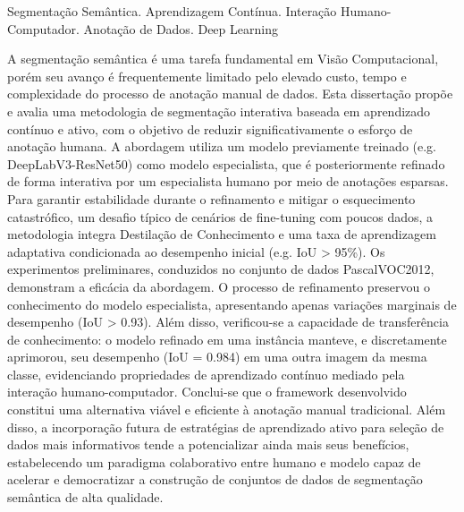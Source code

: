 \documentclass[dissertmst]{ufscar}
\begin{document}
\begin{resumo}{Segmentação Semântica. Aprendizagem Contínua. Interação Humano-Computador. Anotação de Dados. Deep Learning}

A segmentação semântica é uma tarefa fundamental em Visão Computacional, porém seu avanço é frequentemente limitado pelo elevado custo, tempo e complexidade do processo de anotação manual de dados. Esta dissertação propõe e avalia 
uma metodologia de segmentação interativa baseada em aprendizado contínuo e ativo, com o objetivo de reduzir significativamente o esforço de anotação humana. A abordagem utiliza um modelo previamente treinado (e.g. DeepLabV3-ResNet50) como modelo especialista, que é posteriormente refinado de forma interativa por um especialista humano por meio de anotações esparsas. Para garantir estabilidade durante o refinamento e mitigar o esquecimento catastrófico, um desafio típico de cenários de fine-tuning com poucos dados, a metodologia integra Destilação de Conhecimento e uma taxa de aprendizagem adaptativa condicionada ao desempenho inicial (e.g. \ac{IoU} > 95\%). Os experimentos preliminares, conduzidos no conjunto de dados \ac{PascalVOC2012}, demonstram a eficácia da abordagem. O processo de refinamento preservou o conhecimento do modelo especialista, apresentando apenas variações marginais de desempenho (\ac{IoU} > 0.93). Além disso, verificou-se a capacidade de transferência de conhecimento: o modelo refinado em uma instância manteve, e discretamente aprimorou, seu desempenho (\ac{IoU} = 0.984) em uma outra imagem da mesma classe, evidenciando propriedades de aprendizado contínuo mediado pela interação humano-computador. Conclui-se que o framework desenvolvido constitui uma alternativa viável e eficiente à anotação manual tradicional. Além disso, a incorporação futura de estratégias de aprendizado ativo para seleção de dados mais informativos tende a potencializar ainda mais seus benefícios, estabelecendo um paradigma colaborativo entre humano e modelo capaz de acelerar e democratizar a construção de conjuntos de dados de segmentação semântica de alta qualidade. %


\end{resumo}
\end{document}
